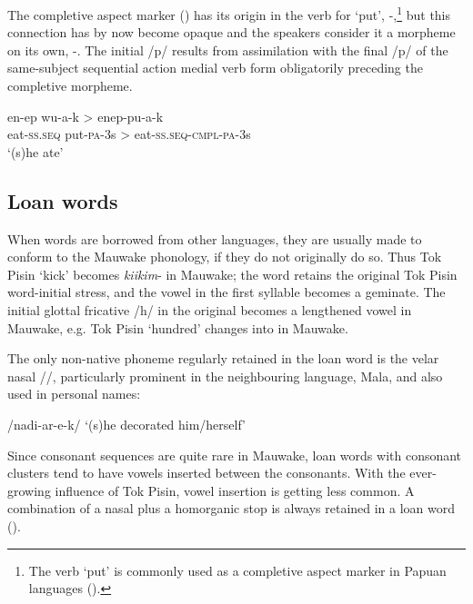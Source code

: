The completive aspect marker () has its origin in the verb for `put', \nobreakdash-,\footnote{The verb `put' is commonly used as a completive aspect marker in Papuan languages ().} but this connection has by now become opaque and the speakers consider it a morpheme on its own, -.  The initial /p/ results from assimilation with the final /p/ of the same-subject sequential action medial verb form obligatorily preceding the completive morpheme.

\ea
\gll en-ep  wu-a-k  {\upshape \textgreater}  enep-pu-a-k \\ 
eat-\textsc{ss}.\textsc{seq}  put-\textsc{pa}-3s  {{\textgreater}}  eat-\textsc{ss}.\textsc{seq}-\textsc{cmpl}-\textsc{pa}-3s\\
\glt `(s)he ate'
\z

\subsection{Loan words}\label{sec:2:y:x}

When words are borrowed from other languages, they are usually made to conform to the Mauwake phonology, if they do not originally do so.  Thus Tok Pisin  `kick' becomes \textit{kiikim}- in Mauwake; the word retains the original Tok Pisin word-initial stress, and the vowel in the first syllable becomes a geminate.  The initial glottal fricative /h/ in the original becomes a lengthened vowel in Mauwake, e.g. Tok Pisin  `hundred' changes into   in Mauwake.

The only non-native phoneme regularly retained in the loan word is the velar nasal /{\ng}/, particularly prominent in the neighbouring language, Mala, and also used in personal names:

\ea
/nadi{\ng-ar-e-k/}  `(s)he decorated him/herself'
\z

Since consonant sequences are quite rare in Mauwake, loan words with consonant clusters tend to have vowels inserted between the consonants.  With the ever-growing influence of Tok Pisin, vowel insertion is getting less common.  A combination of a nasal plus a homorganic stop is always retained in a loan word ().

